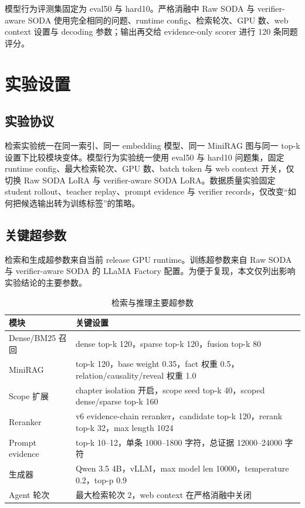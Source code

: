 \documentclass[UTF8,a4paper,12pt]{ctexart}
\begin{document}
模型行为评测集固定为 eval50 与 hard10。严格消融中 Raw SODA 与 verifier-aware SODA 使用完全相同的问题、runtime config、检索轮次、GPU 数、web context 设置与 decoding 参数；输出再交给 evidence-only scorer 进行 120 条同题评分。

\section{实验设置}

\subsection{实验协议}

检索实验统一在同一索引、同一 embedding 模型、同一 MiniRAG 图与同一 top-k 设置下比较模块变体。模型行为实验统一使用 eval50 与 hard10 问题集，固定 runtime config、最大检索轮次、GPU 数、batch token 与 web context 开关，仅切换 Raw SODA LoRA 与 verifier-aware SODA LoRA。数据质量实验固定 student rollout、teacher replay、prompt evidence 与 verifier records，仅改变“如何把候选输出转为训练标签”的策略。

\subsection{关键超参数}

检索和生成超参数来自当前 release GPU runtime。训练超参数来自 Raw SODA 与 verifier-aware SODA 的 LLaMA Factory 配置。为便于复现，本文仅列出影响实验结论的主要参数。

\begin{table}[htbp]
\centering
\small
\begin{tabular}{ll}
\toprule
模块 & 关键设置 \\
\midrule
Dense/BM25 召回 & dense top-k 120，sparse top-k 120，fusion top-k 80 \\
MiniRAG & top-k 120，base weight 0.35，fact 权重 0.5，relation/causality/reveal 权重 1.0 \\
Scope 扩展 & chapter isolation 开启，scope seed top-k 40，scoped dense/sparse top-k 160 \\
Reranker & v6 evidence-chain reranker，candidate top-k 120，rerank top-k 32，max length 1024 \\
Prompt evidence & top-k 10--12，单条 1000--1800 字符，总证据 12000--24000 字符 \\
生成器 & Qwen 3.5 4B，vLLM，max model len 10000，temperature 0.2，top-p 0.9 \\
Agent 轮次 & 最大检索轮次 2，web context 在严格消融中关闭 \\
\bottomrule
\end{tabular}
\caption{检索与推理主要超参数}
\end{table}
\end{document}
